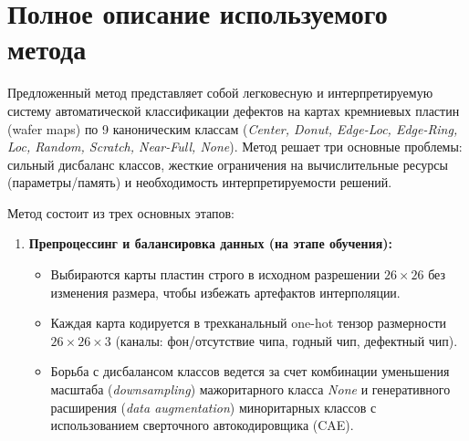 \documentclass[11pt,a4paper]{article}
\begin{document}
\section{Полное описание используемого метода}

Предложенный метод представляет собой легковесную и интерпретируемую систему автоматической классификации дефектов на картах кремниевых пластин (wafer maps) по 9 каноническим классам (\textit{Center, Donut, Edge-Loc, Edge-Ring, Loc, Random, Scratch, Near-Full, None}). Метод решает три основные проблемы: сильный дисбаланс классов, жесткие ограничения на вычислительные ресурсы (параметры/память) и необходимость интерпретируемости решений.

Метод состоит из трех основных этапов:
\begin{enumerate}
    \item \textbf{Препроцессинг и балансировка данных (на этапе обучения):}
    \begin{itemize}
        \item Выбираются карты пластин строго в исходном разрешении $26 \times 26$ без изменения размера, чтобы избежать артефактов интерполяции.
        \item Каждая карта кодируется в трехканальный one-hot тензор размерности $26 \times 26 \times 3$ (каналы: фон/отсутствие чипа, годный чип, дефектный чип).
        \item Борьба с дисбалансом классов ведется за счет комбинации уменьшения масштаба (\textit{downsampling}) мажоритарного класса \textit{None} и генеративного расширения (\textit{data augmentation}) миноритарных классов с использованием сверточного автокодировщика (CAE).
    \end{itemize}


\end{enumerate}
\end{document}

